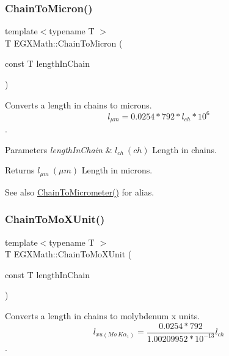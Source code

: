 \subsubsection{\texorpdfstring{Chain\+To\+Micron()}{ChainToMicron()}}
{\footnotesize\ttfamily template$<$typename T $>$ \\
T E\+G\+X\+Math\+::\+Chain\+To\+Micron (\begin{DoxyParamCaption}\item[{const T}]{length\+In\+Chain }\end{DoxyParamCaption})}



Converts a length in chains to microns. \[ l_{\mu m}=0.0254 * 792 * l_{ch} * 10^{6} \]. 


\begin{DoxyParams}{Parameters}
{\em length\+In\+Chain} & $ l_{ch}\ (ch)$ Length in chains. \\
\hline
\end{DoxyParams}
\begin{DoxyReturn}{Returns}
$ l_{\mu m}\ (\mu m)$ Length in microns. 
\end{DoxyReturn}
\begin{DoxySeeAlso}{See also}
\mbox{\hyperlink{group___e_g_x_math-_conversions-_length_conversions-_surveyors-_chain-_s_i_gab6d1ab0738e0a31f328352569fa00767}{Chain\+To\+Micrometer()}} for alias. 
\end{DoxySeeAlso}
\mbox{\label{group___e_g_x_math-_conversions-_length_conversions-_surveyors-_chain-_non-_s_i_gae4a2b99d846db53416e9fc5d6f9e957c}} 
\subsubsection{\texorpdfstring{Chain\+To\+Mo\+X\+Unit()}{ChainToMoXUnit()}}
{\footnotesize\ttfamily template$<$typename T $>$ \\
T E\+G\+X\+Math\+::\+Chain\+To\+Mo\+X\+Unit (\begin{DoxyParamCaption}\item[{const T}]{length\+In\+Chain }\end{DoxyParamCaption})}



Converts a length in chains to molybdenum x units. \[ l_{xu(Mo\ K\alpha_1)}=\frac{0.0254 * 792}{1.00209952*10^{-13}} l_{ch}\]. 


